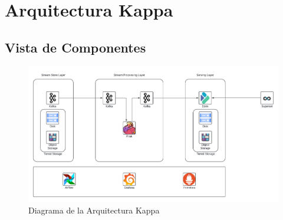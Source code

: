 \section{Arquitectura Kappa}

\subsection{Vista de Componentes}

\begin{figure}[h]
\centering
\includegraphics[width=1\textwidth]{desarrollo/Kappa.png}
\caption{Diagrama de la Arquitectura Kappa}
\label{fig:des_arquitectura_kappa}
\end{figure}